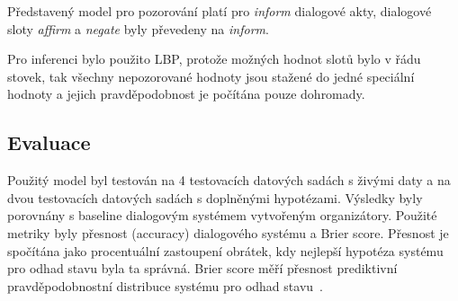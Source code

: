 Představený model pro pozorování platí pro \emph{inform} dialogové akty, dialogové sloty \emph{affirm} a \emph{negate} byly převedeny na \emph{inform}.

Pro inferenci bylo použito LBP, protože možných hodnot slotů bylo v řádu stovek, tak všechny nepozorované hodnoty jsou stažené do jedné speciální hodnoty a jejich pravděpodobnost je počítána pouze dohromady.

\subsection{Evaluace}

Použitý model byl testován na 4 testovacích datových sadách s živými daty a na dvou testovacích datových sadách s doplněnými hypotézami.
Výsledky byly porovnány s baseline dialogovým systémem vytvořeným organizátory.
Použité metriky byly přesnost (accuracy) dialogového systému a Brier score.
Přesnost je spočítána jako procentuální zastoupení obrátek, kdy nejlepší hypotéza systému pro odhad stavu byla ta správná.
Brier score měří přesnost prediktivní pravděpodobnostní distribuce systému pro odhad stavu~\cite{brier1950verification}.